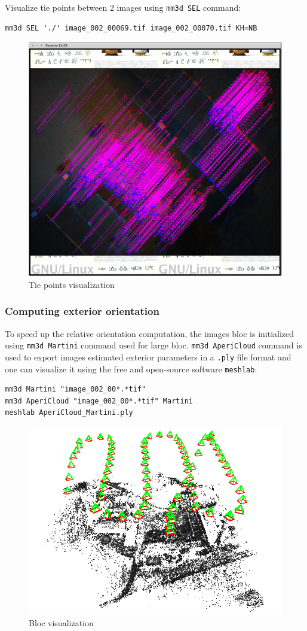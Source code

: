 Visualize tie points between 2 images using {\tt mm3d SEL} command:

\begin{verbatim}
mm3d SEL './' image_002_00069.tif image_002_00070.tif KH=NB
\end{verbatim}

\begin{figure}[H]
    \begin{center}
    \setlength{\unitlength}{0.5cm}
    \includegraphics[width=0.5\linewidth]{FIGS/Viabon/sel.png}
    \end{center}
    \caption{Tie points visualization}
    \label{fig:sel}
\end{figure}

\subsubsection{Computing exterior orientation}

To speed up the relative orientation computation, the images bloc is initialized using {\tt mm3d Martini} command used for large bloc. {\tt mm3d AperiCloud} command is used to export images estimated exterior parameters in a {\tt .ply} file format and one can visualize it using the free and open-source software {\tt meshlab}:

\begin{verbatim}
mm3d Martini "image_002_00*.*tif"
mm3d AperiCloud "image_002_00*.*tif" Martini
meshlab AperiCloud_Martini.ply
\end{verbatim}

\begin{figure}[H]
    \begin{center}
    \setlength{\unitlength}{0.5cm}
    \includegraphics[width=0.5\linewidth]{FIGS/Viabon/apericloud.png}
    \end{center}
    \caption{Bloc visualization}
    \label{fig:sel}
\end{figure}


